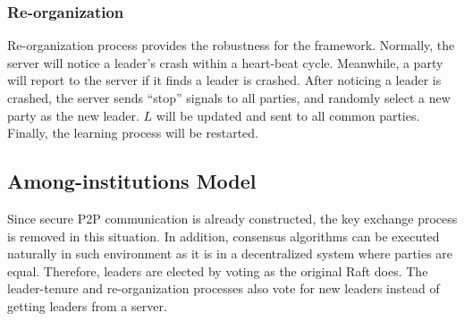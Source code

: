 \subsubsection{\textbf{Re-organization}}
Re-organization process provides the robustness for the framework. Normally, the server will notice a leader's crash within a heart-beat cycle. Meanwhile, a party will report to the server if it finds a leader is crashed. After noticing a leader is crashed, the server sends ``stop'' signals to all parties, and randomly select a new party as the new leader. $L$ will be updated and sent to all common parties. Finally, the learning process will be restarted.

\subsection{Among-institutions Model}
Since secure P2P communication is already constructed, the key exchange process is removed in this situation. In addition, consensus algorithms can be executed naturally in such environment as it is in a decentralized system where parties are equal. Therefore, leaders are elected by voting as the original Raft does. The leader-tenure and re-organization processes also vote for new leaders instead of getting leaders from a server.

